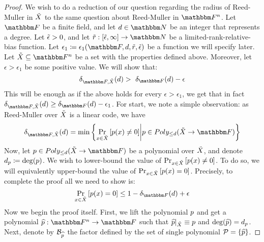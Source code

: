 \begin{proof}
    We wish to do a reduction of our question regarding the radius of Reed-Muller in ${\tilde{X}}$ to the same question about Reed-Muller in $\field$.
    Let $\basefield$ be a finite field, and let $\degree \in \naturalnumbersset$ be an integer that represents a degree.
    Let ${\tilde{\epsilon}} > 0$, and let $\funcdef{\rankbiasfunc}{[\epsilonlimitedrankbias, \infty]}{\naturalnumbersset}$ be a limited-rank-relative-bias function.
    Let $\epsilon_1 \definedas \epsilon_1(\basefield, \degree, \rankbiasfunc, \epsilonlimitedrankbias)$ be a function we will specify later.
    Let $\variety \subseteq \field$ be a set with the properties defined above.
    \newline
    Moreover, let $\epsilon > \epsilon_1$ be some positive value.
    We will show that:
    \[
        \normalizedcodedistanceex{\basefield}{\variety}{\degree} > \
        \normalizedcodedistance{\basefield}{\degree} - \epsilon
    \]
    This will be enough as if the above holds for every $\epsilon > \epsilon_1$, we get that in fact
    $\normalizedcodedistanceex{\basefield}{\variety}{\degree} \geq \normalizedcodedistance{\basefield}{\degree} - \epsilon_1$.
    \newline
    For start, we note a simple observation: as Reed-Muller over ${\tilde{X}}$ is a linear code, we have
    \[
        \normalizedcodedistanceex{\basefield}{\variety}{\degree} =
        \min \set{\prex{x \in \variety}{\onvarpoly(x) \neq 0} \suchthat \onvarpoly \in \allpolyset{\leq \degree}{\variety}{\basefield}}
    \]
    Now, let $\onvarpoly \in \allpolyset{\leq \degree}{\variety}{\basefield}$ be a polynomial over ${\tilde{X}}$,
    and denote $\degree_{\onvarpoly} \definedas \deg(\onvarpoly)$.
    We wish to lower-bound the value of $\prex{x \in \variety}{\onvarpoly(x) \neq 0}$.
    To do so, we will equivalently upper-bound the value of $\prex{x \in \variety}{\onvarpoly(x) = 0}$.
    Precisely, to complete the proof all we need to show is:
    \[
        \prex{x \in \variety}{\onvarpoly(x) = 0} \leq 1 - \normalizedcodedistance{\basefield}{\degree} + \epsilon
    \]
    \newline
    Now we begin the proof itself.
    First, we lift the polynomial $\onvarpoly$ and get a polynomial $\funcdef{\lift{\onvarpoly}}{\field}{\basefield}$
    such that $\restrictfunc{\lift{\onvarpoly}}{\variety} \equiv \onvarpoly$ and $\deg(\lift{\onvarpoly}) = \degree_{\onvarpoly}$.
    Next, denote by $\factor_{\lift{\onvarpoly}}$ the factor defined by the set of single polynomial $\genpolyset = \set {\lift{\onvarpoly}}$.

\end{proof}
